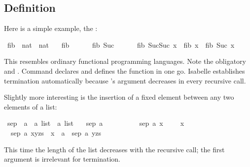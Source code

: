 %
\begin{isabellebody}%
\def\isabellecontext{fun{\isadigit{0}}}%
%
\isadelimtheory
%
\endisadelimtheory
%
\isatagtheory
%
\endisatagtheory
{\isafoldtheory}%
%
\isadelimtheory
%
\endisadelimtheory
%
\begin{isamarkuptext}%
\subsection{Definition}
\label{sec:fun-examples}

Here is a simple example, the :%
\end{isamarkuptext}%
\isamarkuptrue%
\isamarkupfalse%
\ fib\ {\isacharcolon}{\isacharcolon}\ {\isachardoublequoteopen}nat\ {\isasymRightarrow}\ nat{\isachardoublequoteclose}\ \isanewline
\ \ {\isachardoublequoteopen}fib\ {}\ {\isacharequal}\ {}{\isachardoublequoteclose}\ {\isacharbar}\isanewline
\ \ {\isachardoublequoteopen}fib\ {\isacharparenleft}Suc\ {}{\isacharparenright}\ {\isacharequal}\ {}{\isachardoublequoteclose}\ {\isacharbar}\isanewline
\ \ {\isachardoublequoteopen}fib\ {\isacharparenleft}Suc{\isacharparenleft}Suc\ x{\isacharparenright}{\isacharparenright}\ {\isacharequal}\ fib\ x\ {\isacharplus}\ fib\ {\isacharparenleft}Suc\ x{\isacharparenright}{\isachardoublequoteclose}%
\begin{isamarkuptext}%
\noindent
This resembles ordinary functional programming languages. Note the obligatory
 and \isa{|}. Command  declares and
defines the function in one go. Isabelle establishes termination automatically
because 's argument decreases in every recursive call.

Slightly more interesting is the insertion of a fixed element
between any two elements of a list:%
\end{isamarkuptext}%
\isamarkuptrue%
\isamarkupfalse%
\ sep\ {\isacharcolon}{\isacharcolon}\ {\isachardoublequoteopen}{\isacharprime}a\ {\isasymRightarrow}\ {\isacharprime}a\ list\ {\isasymRightarrow}\ {\isacharprime}a\ list{\isachardoublequoteclose}\ \isanewline
\ \ {\isachardoublequoteopen}sep\ a\ {\isacharbrackleft}{\isacharbrackright}\ \ \ \ \ {\isacharequal}\ {\isacharbrackleft}{\isacharbrackright}{\isachardoublequoteclose}\ {\isacharbar}\isanewline
\ \ {\isachardoublequoteopen}sep\ a\ {\isacharbrackleft}x{\isacharbrackright}\ \ \ \ {\isacharequal}\ {\isacharbrackleft}x{\isacharbrackright}{\isachardoublequoteclose}\ {\isacharbar}\isanewline
\ \ {\isachardoublequoteopen}sep\ a\ {\isacharparenleft}x{\isacharhash}y{\isacharhash}zs{\isacharparenright}\ {\isacharequal}\ x\ {\isacharhash}\ a\ {\isacharhash}\ sep\ a\ {\isacharparenleft}y{\isacharhash}zs{\isacharparenright}{\isachardoublequoteclose}%
\begin{isamarkuptext}%
\noindent
This time the length of the list decreases with the
recursive call; the first argument is irrelevant for termination.


\end{isamarkuptext}
\end{isabellebody}
